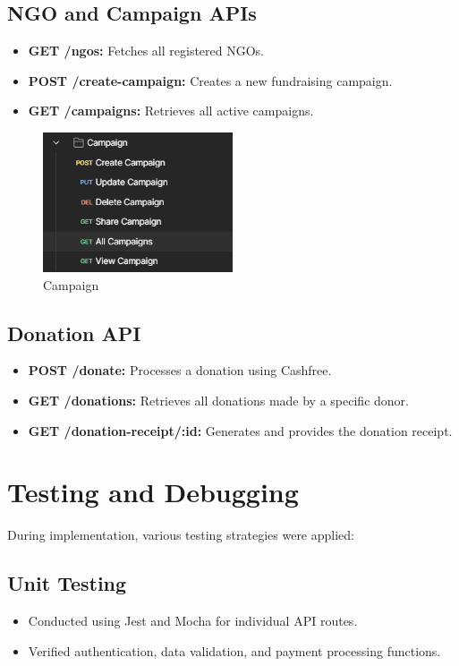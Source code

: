 \subsection{NGO and Campaign APIs}
\begin{itemize}
    \item \textbf{GET /ngos:} Fetches all registered NGOs.
    \item \textbf{POST /create-campaign:} Creates a new fundraising campaign.
    \item \textbf{GET /campaigns:} Retrieves all active campaigns.
\end{itemize}
\begin{figure}[h]
    \centering
    \includegraphics[width=0.5\textwidth]{images/Campaign.png}
    \caption{Campaign}
    \label{fig: Campaign}
\end{figure}

\subsection{Donation API}
\begin{itemize}
    \item \textbf{POST /donate:} Processes a donation using Cashfree.
    \item \textbf{GET /donations:} Retrieves all donations made by a specific donor.
    \item \textbf{GET /donation-receipt/:id:} Generates and provides the donation receipt.
\end{itemize}

\section{Testing and Debugging}
During implementation, various testing strategies were applied:

\subsection{Unit Testing}
\begin{itemize}
    \item Conducted using Jest and Mocha for individual API routes.
    \item Verified authentication, data validation, and payment processing functions.
\end{itemize}


